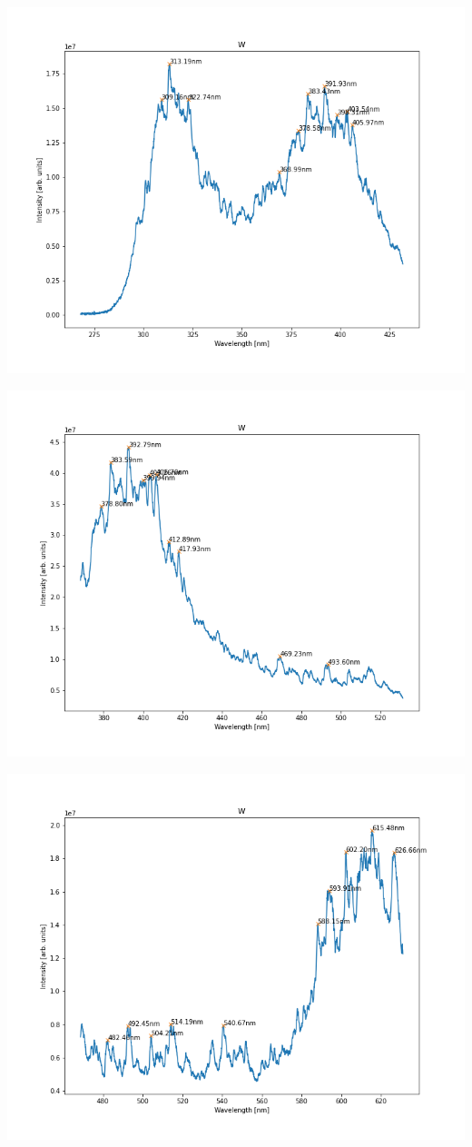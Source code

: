 \documentclass{beamer}
\begin{document}
\begin{frame}
    \includegraphics[scale=0.45]{W/W_350.png}
\end{frame}

\begin{frame}
    \includegraphics[scale=0.45]{W/W_450.png}
\end{frame}

\begin{frame}
    \includegraphics[scale=0.45]{W/W_550.png}
\end{frame}
\end{document}
